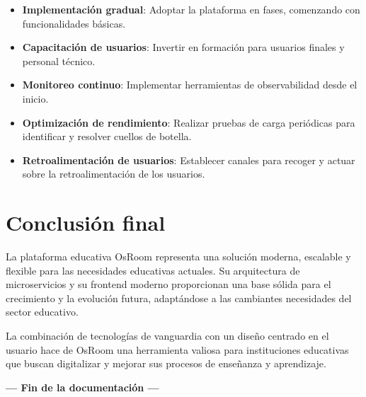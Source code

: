 \documentclass[12pt,a4paper]{report}
\begin{document}
\begin{itemize}
    \item \textbf{Implementación gradual}: Adoptar la plataforma en fases, comenzando con funcionalidades básicas.
    \item \textbf{Capacitación de usuarios}: Invertir en formación para usuarios finales y personal técnico.
    \item \textbf{Monitoreo continuo}: Implementar herramientas de observabilidad desde el inicio.
    \item \textbf{Optimización de rendimiento}: Realizar pruebas de carga periódicas para identificar y resolver cuellos de botella.
    \item \textbf{Retroalimentación de usuarios}: Establecer canales para recoger y actuar sobre la retroalimentación de los usuarios.
\end{itemize}

\section{Conclusión final}
La plataforma educativa OsRoom representa una solución moderna, escalable y flexible para las necesidades educativas actuales. Su arquitectura de microservicios y su frontend moderno proporcionan una base sólida para el crecimiento y la evolución futura, adaptándose a las cambiantes necesidades del sector educativo.

La combinación de tecnologías de vanguardia con un diseño centrado en el usuario hace de OsRoom una herramienta valiosa para instituciones educativas que buscan digitalizar y mejorar sus procesos de enseñanza y aprendizaje.

\begin{center}
    \textbf{--- Fin de la documentación ---}
\end{center}

\backmatter
\appendix
\end{document}
